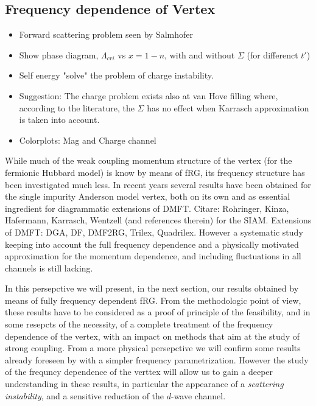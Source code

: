 \subsection{Frequency dependence of Vertex}

\begin{itemize}

\item Forward scattering problem seen by Salmhofer

\item Show phase diagram, $\Lambda_{cri}$ vs $x=1-n$, with and without $\Sigma$ 
          (for differenct $t'$)
          
\item Self energy "solve" the problem of charge instability.

\item Suggestion: The charge problem exists also at van Hove filling where, according to the literature, 
           the $\Sigma$ has no effect when Karrasch approximation is taken into account.

\item  Colorplots: Mag and Charge channel

\end{itemize}

While much of the weak coupling momentum structure of the vertex (for the fermionic Hubbard model) is know by means of fRG, its frequency structure has been investigated much less. 
In recent years several results have been obtained for the single impurity Anderson model vertex, both on its own and as essential ingredient for diagrammatic extensions of DMFT. 
Citare: Rohringer, Kinza, Hafermann, Karrasch, Wentzell (and references therein) for the SIAM. Extensions of DMFT: DGA, DF, DMF2RG, Trilex, Quadrilex. 
However a systematic study keeping into account the full frequency dependence and a physically motivated approximation for the momentum dependence, and including fluctuations in all channels is still lacking.

In this persepctive we will present, in the next section, our results obtained by means of fully frequency dependent fRG.
From the methodologic point of view, these results have to be considered as a proof of principle of the feasibility, and in some resepcts of the necessity, of a complete treatment of the frequency dependence of the vertex, with an impact on methods that aim at the study of strong coupling.
From a more physical persepctive we will confirm some results already foreseen by  with a simpler frequency parametrization. However the study of the frequncy dependence of the verttex will allow us to gain a deeper understanding in these results, in particular the appearance of a \textit{scattering instability}, and a sensitive reduction of the $d$-wave channel. 

